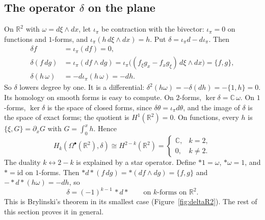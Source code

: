 \documentclass[11pt,oneside,reqno]{article}
\newcommand{\C}{\mathbb C}
\newcommand{\R}{\mathbb R}
\newcommand{\Om}{\Omega}
\newcommand{\pa}{\partial}
\theoremstyle{plain}
\theoremstyle{definition}
\theoremstyle{remark}
\begin{document}
\subsection{The operator \texorpdfstring{\(\delta\)}{delta} on the plane}
\label{subsec:poissonR2}
On \(\R^2\) with \(\omega=d\xi\wedge dx\), let \(\iota_\pi\) be contraction with the
bivector: \(\iota_\pi=0\) on functions and \(1\)-forms, and
\(\iota_\pi(h\,d\xi\wedge dx)=h\). Put \(\delta=\iota_\pi d-d\iota_\pi\). Then
\begin{align*}
 \delta f&=\iota_\pi(df)=0,\\
 \delta(f\,dg)&=\iota_\pi(df\wedge dg)=\iota_\pi\bigl((f_\xi g_x-f_xg_\xi)\,d\xi\wedge dx\bigr)=\{f,g\},\\
 \delta(h\,\omega)&=-d\iota_\pi(h\,\omega)=-dh .
\end{align*}
So \(\delta\) lowers degree by one. It is a differential:
\(\delta^2(h\omega)=-\delta(dh)=-\{1,h\}=0\). Its homology on smooth forms is
easy to compute. On \(2\)-forms, \(\ker\delta=\C\,\omega\). On \(1\)-forms,
\(\ker\delta\) is the space of closed forms, since \(\delta\theta=\iota_\pi d\theta\), and the
image of \(\delta\) is the space of exact forms; the quotient is
\(H^1(\R^2)=0\). On functions, every \(h\) is \(\{\xi,G\}=\pa_xG\) with
\(G=\int_0^xh\). Hence
\[
 H_k(\Om^\bullet(\R^2),\delta)\cong H^{2-k}(\R^2)=\begin{cases}\C,&k=2,\\0,&k\ne2.\end{cases}
\]
The duality \(k\leftrightarrow2-k\) is explained by a star operator. Define
\(*1=\omega\), \(*\omega=1\), and \(*=\mathrm{id}\) on \(1\)-forms. Then
\(*d*(f\,dg)=*(df\wedge dg)=\{f,g\}\) and \(-*d*(h\omega)=-dh\), so
\[
 \delta=(-1)^{k-1}\,*d*\qquad\text{on \(k\)-forms on \(\R^2\)}.
\]
This is Brylinski's theorem in its smallest case
(Figure~\ref{fig:deltaR2}). The rest of this section proves it in general.
\end{document}
